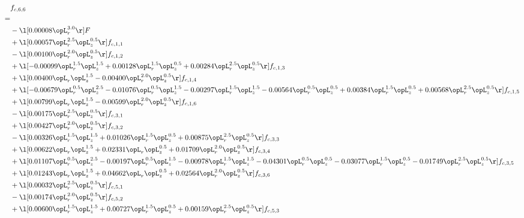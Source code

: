 \begin{alignat}{2} 
\label{eq:f_66_1} 
& f_{c,6,6} \nonumber \\ 
 = \\ 
& - \l[  0.00008 \opL_r^{3.0}  \r] F \nonumber \\ 
& + \l[  0.00057 \opL_r^{2.5} \opL_z^{0.5}  \r] f_{c,1,1} \nonumber \\ 
& - \l[  0.00100 \opL_r^{2.0} \opL_z^{0.5}  \r] f_{c,1,2} \nonumber \\ 
& + \l[  -0.00099 \opL_r^{1.5} \opL_z^{1.5} +  0.00128 \opL_r^{1.5} \opL_z^{0.5} +  0.00284 \opL_r^{2.5} \opL_z^{0.5}  \r] f_{c,1,3} \nonumber \\ 
& + \l[  0.00400 \opL_r \opL_z^{1.5}   -0.00400 \opL_r^{2.0} \opL_z^{0.5}  \r] f_{c,1,4} \nonumber \\ 
& + \l[  -0.00679 \opL_r^{0.5} \opL_z^{2.5}   -0.01076 \opL_r^{0.5} \opL_z^{1.5}   -0.00297 \opL_r^{1.5} \opL_z^{1.5}   -0.00564 \opL_r^{0.5} \opL_z^{0.5} +  0.00384 \opL_r^{1.5} \opL_z^{0.5} +  0.00568 \opL_r^{2.5} \opL_z^{0.5}  \r] f_{c,1,5} \nonumber \\ 
& + \l[  0.00799 \opL_r \opL_z^{1.5}   -0.00599 \opL_r^{2.0} \opL_z^{0.5}  \r] f_{c,1,6} \nonumber \\ 
& - \l[  0.00175 \opL_r^{2.5} \opL_z^{0.5}  \r] f_{c,3,1} \nonumber \\ 
& + \l[  0.00427 \opL_r^{2.0} \opL_z^{0.5}  \r] f_{c,3,2} \nonumber \\ 
& - \l[  0.00326 \opL_r^{1.5} \opL_z^{1.5} +  0.01026 \opL_r^{1.5} \opL_z^{0.5} +  0.00875 \opL_r^{2.5} \opL_z^{0.5}  \r] f_{c,3,3} \nonumber \\ 
& + \l[  0.00622 \opL_r \opL_z^{1.5} +  0.02331 \opL_r \opL_z^{0.5} +  0.01709 \opL_r^{2.0} \opL_z^{0.5}  \r] f_{c,3,4} \nonumber \\ 
& + \l[  0.01107 \opL_r^{0.5} \opL_z^{2.5}   -0.00197 \opL_r^{0.5} \opL_z^{1.5}   -0.00978 \opL_r^{1.5} \opL_z^{1.5}   -0.04301 \opL_r^{0.5} \opL_z^{0.5}   -0.03077 \opL_r^{1.5} \opL_z^{0.5}   -0.01749 \opL_r^{2.5} \opL_z^{0.5}  \r] f_{c,3,5} \nonumber \\ 
& + \l[  0.01243 \opL_r \opL_z^{1.5} +  0.04662 \opL_r \opL_z^{0.5} +  0.02564 \opL_r^{2.0} \opL_z^{0.5}  \r] f_{c,3,6} \nonumber \\ 
& + \l[  0.00032 \opL_r^{2.5} \opL_z^{0.5}  \r] f_{c,5,1} \nonumber \\ 
& - \l[  0.00174 \opL_r^{2.0} \opL_z^{0.5}  \r] f_{c,5,2} \nonumber \\ 
& + \l[  0.00600 \opL_r^{1.5} \opL_z^{1.5} +  0.00727 \opL_r^{1.5} \opL_z^{0.5} +  0.00159 \opL_r^{2.5} \opL_z^{0.5}  \r] f_{c,5,3} \nonumber \\ 

\end{alignat}
